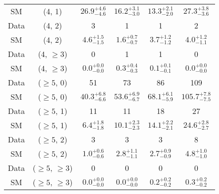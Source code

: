 \begin{table}[h!]
{\begin{tabular}{cccccc}
	SM & (4, 1) & $26.9^{+ 4.6 }_{- 4.6 }$ & $16.2^{+ 3.1 }_{- 3.0 }$ & $13.3^{+ 2.1 }_{- 2.0 }$ & $27.3^{+ 3.8 }_{- 3.6 }$ \\[0.5ex] 
	Data & (4, 2) & 3 & 1 & 1 & 2 \\[0.5ex] 
	SM & (4, 2) & $4.6^{+ 1.5 }_{- 1.5 }$ & $1.6^{+ 0.7 }_{- 0.7 }$ & $3.7^{+ 1.2 }_{- 1.2 }$ & $4.0^{+ 1.2 }_{- 1.1 }$ \\[0.5ex] 
	Data & (4, $\ge3$) & 0 & 1 & 1 & 0 \\[0.5ex] 
	SM & (4, $\ge3$) & $0.0^{+ 0.0 }_{- 0.0 }$ & $0.3^{+ 0.4 }_{- 0.3 }$ & $0.1^{+ 0.1 }_{- 0.1 }$ & $0.0^{+ 0.0 }_{- 0.0 }$ \\[0.5ex] 
	Data & ($\ge5$, 0) & 51 & 73 & 86 & 109 \\[0.5ex] 
	SM & ($\ge5$, 0) & $40.3^{+ 6.8 }_{- 6.6 }$ & $53.6^{+ 6.9 }_{- 6.7 }$ & $68.1^{+ 6.1 }_{- 5.9 }$ & $105.7^{+ 7.8 }_{- 7.5 }$ \\[0.5ex] 
	Data & ($\ge5$, 1) & 11 & 11 & 18 & 27 \\[0.5ex] 
	SM & ($\ge5$, 1) & $6.4^{+ 1.8 }_{- 1.8 }$ & $10.1^{+ 2.3 }_{- 2.3 }$ & $14.1^{+ 2.2 }_{- 2.1 }$ & $24.6^{+ 2.8 }_{- 2.7 }$ \\[0.5ex] 
	Data & ($\ge5$, 2) & 3 & 3 & 3 & 8 \\[0.5ex] 
	SM & ($\ge5$, 2) & $1.0^{+ 0.6 }_{- 0.6 }$ & $2.8^{+ 1.1 }_{- 1.1 }$ & $2.7^{+ 0.9 }_{- 0.9 }$ & $4.8^{+ 1.0 }_{- 1.0 }$ \\[0.5ex] 
	Data & ($\ge5$, $\ge3$) & 0 & 0 & 0 & 0 \\[0.5ex] 
	SM & ($\ge5$, $\ge3$) & $0.0^{+ 0.0 }_{- 0.0 }$ & $0.0^{+ 0.0 }_{- 0.0 }$ & $0.2^{+ 0.2 }_{- 0.2 }$ & $0.3^{+ 0.2 }_{- 0.2 }$ \\[0.5ex] 
	\hline
	\hline
\end{tabular}}
\end{table}
